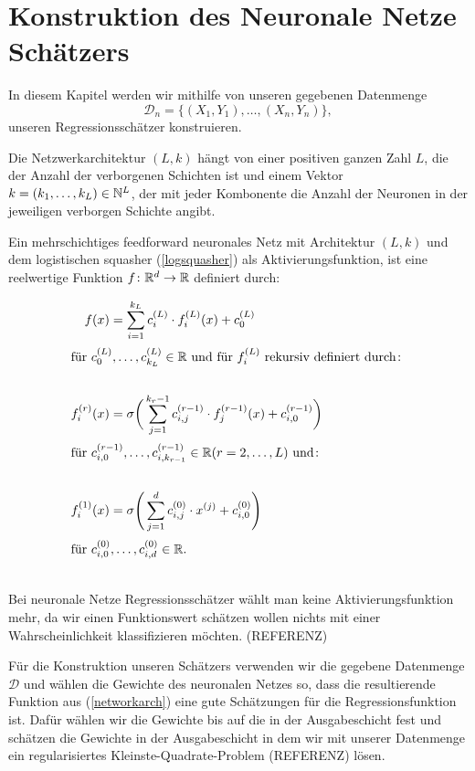 \chapter{Konstruktion des Neuronale Netze Schätzers}
\label{chap:2}

In diesem Kapitel werden wir mithilfe von unseren gegebenen Datenmenge 
$$ \mathcal{D}_n = \{(X_1, Y_1),\dots,(X_n, Y_n)\},$$
unseren Regressionsschätzer konstruieren. 

Die Netzwerkarchitektur $(L, k)$ hängt von einer positiven ganzen Zahl $L$, die der Anzahl der verborgenen Schichten ist und einem Vektor $k = (k_1,\dots,k_L) \in \mathbb{N}^L$, der mit jeder Kombonente die Anzahl der Neuronen in der jeweiligen verborgen Schichte angibt. 

Ein mehrschichtiges feedforward neuronales Netz mit Architektur $(L, k)$ und dem logistischen squasher (\ref{logsquasher}) als Aktivierungsfunktion, ist eine reelwertige Funktion $f\colon \mathbb{R}^d \to \mathbb{R}$ definiert durch$\colon$

\begin{align}
\label{networkarch}
f(x) & = \sum_{i = 1}^{k_L} c_i^{(L)} \cdot f_i^{(L)}(x) + c_0^{(L)} \nonumber \\
\intertext{für $c_0^{(L)},\dots,c_{k_L}^{(L)} \in \mathbb{R}$ und für $f_i^{(L)}$ rekursiv definiert durch$\colon$} \nonumber \\
f_i^{(r)}(x) & = \sigma \bigg(\sum_{j = 1}^{k_r - 1} c_{i,j}^{(r - 1)} \cdot f_j^{(r - 1)}(x) + c_{i,0}^{(r - 1)} \bigg) \nonumber \\
\intertext{für $c_{i,0}^{(r - 1)},\dots,c_{i,k_{r - 1}}^{(r - 1)} \in \mathbb{R} (r = 2,\dots, L)$ und$\colon$} \\
f_i^{(1)}(x) & = \sigma \Bigg(\sum_{j = 1}^{d} c_{i,j}^{(0)} \cdot x^{(j)} + c_{i,0}^{(0)} \Bigg) \nonumber \\
\intertext{für $c_{i,0}^{(0)},\dots,c_{i,d}^{(0)} \in \mathbb{R}$.} \nonumber
\end{align} 
Bei neuronale Netze Regressionsschätzer wählt man keine Aktivierungsfunktion mehr, da wir einen Funktionswert schätzen wollen nichts mit einer Wahrscheinlichkeit klassifizieren möchten. (REFERENZ)

Für die Konstruktion unseren Schätzers verwenden wir die gegebene Datenmenge $\mathcal{D}$ und wählen die Gewichte des neuronalen Netzes so, dass die resultierende Funktion aus (\ref{networkarch}) eine gute Schätzungen für die Regressionsfunktion ist. Dafür wählen wir die Gewichte bis auf die in der Ausgabeschicht fest und schätzen die Gewichte in der Ausgabeschicht in dem wir mit unserer Datenmenge ein regularisiertes Kleinste-Quadrate-Problem (REFERENZ) lösen.


